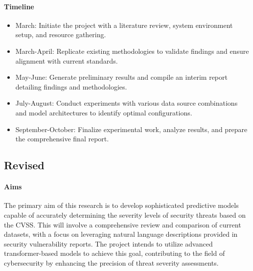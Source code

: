 \documentclass[12pt]{article}
\begin{document}
\paragraph{Timeline}
\begin{itemize}[noitemsep]
	\item March: Initiate the project with a literature review, system environment setup, and resource gathering.
	\item March-April: Replicate existing methodologies to validate findings and ensure alignment with current standards.
	\item May-June: Generate preliminary results and compile an interim report detailing findings and methodologies.
	\item July-August: Conduct experiments with various data source combinations and model architectures to identify optimal configurations.
	\item September-October: Finalize experimental work, analyze results, and prepare the comprehensive final report.
\end{itemize}

\subsection{Revised}

\paragraph{Aims}

The primary aim of this research is to develop sophisticated predictive models capable of accurately determining
the severity levels of security threats based on the CVSS. This will involve a comprehensive review and comparison
of current datasets, with a focus on leveraging natural language descriptions provided in security vulnerability reports.
The project intends to utilize advanced transformer-based models to achieve this goal, contributing to the field of
cybersecurity by enhancing the precision of threat severity assessments.
\end{document}
